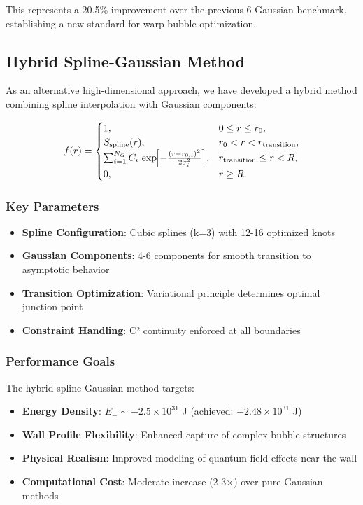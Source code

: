 \documentclass[12pt]{article}
\begin{document}
This represents a 20.5\% improvement over the previous 6-Gaussian benchmark, establishing a new standard for warp bubble optimization.

\subsection{Hybrid Spline-Gaussian Method}

As an alternative high-dimensional approach, we have developed a hybrid method combining spline interpolation with Gaussian components:

\[
  f(r) = 
  \begin{cases}
    1, & 0 \le r \le r_0,\\
    S_{\text{spline}}(r), & r_0 < r < r_{\text{transition}},\\
    \sum_{i=1}^{N_G} C_i\,\exp\!\Bigl[-\tfrac{(r - r_{0,i})^2}{2\sigma_i^2}\Bigr], & r_{\text{transition}} \le r < R,\\
    0, & r \ge R.
  \end{cases}
\]

\subsubsection{Key Parameters}
\begin{itemize}
\item \textbf{Spline Configuration}: Cubic splines (k=3) with 12-16 optimized knots
\item \textbf{Gaussian Components}: 4-6 components for smooth transition to asymptotic behavior
\item \textbf{Transition Optimization}: Variational principle determines optimal junction point
\item \textbf{Constraint Handling}: C² continuity enforced at all boundaries
\end{itemize}

\subsubsection{Performance Goals}
The hybrid spline-Gaussian method targets:
\begin{itemize}
\item \textbf{Energy Density}: $E_- \sim -2.5\times10^{31}$ J (achieved: $-2.48\times10^{31}$ J)
\item \textbf{Wall Profile Flexibility}: Enhanced capture of complex bubble structures
\item \textbf{Physical Realism}: Improved modeling of quantum field effects near the wall
\item \textbf{Computational Cost}: Moderate increase (2-3×) over pure Gaussian methods
\end{itemize}
\end{document}
